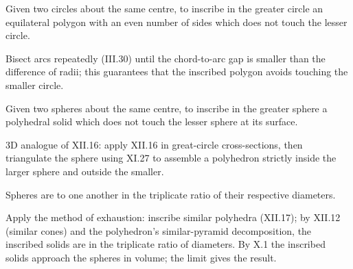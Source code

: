 \documentclass{rrxiv}
\begin{document}
\begin{claim}
\label{prop:XII.16}
Given two circles about the same centre, to inscribe in the greater
circle an equilateral polygon with an even number of sides which
does not touch the lesser circle.
\end{claim}
\begin{evidence}
\label{ev:XII.16}
Bisect arcs repeatedly (III.30) until the chord-to-arc gap is
smaller than the difference of radii; this guarantees that the
inscribed polygon avoids touching the smaller circle.
\end{evidence}

\begin{claim}
\label{prop:XII.17}
Given two spheres about the same centre, to inscribe in the greater
sphere a polyhedral solid which does not touch the lesser sphere at
its surface.
\end{claim}
\begin{evidence}
\label{ev:XII.17}
3D analogue of XII.16: apply XII.16 in great-circle cross-sections,
then triangulate the sphere using XI.27 to assemble a polyhedron
strictly inside the larger sphere and outside the smaller.
\end{evidence}

\begin{claim}
\label{prop:XII.18}
Spheres are to one another in the triplicate ratio of their
respective diameters.
\end{claim}
\begin{evidence}
\label{ev:XII.18}
Apply the method of exhaustion: inscribe similar polyhedra (XII.17);
by XII.12 (similar cones) and the polyhedron's similar-pyramid
decomposition, the inscribed solids are in the triplicate ratio of
diameters.  By X.1 the inscribed solids approach the spheres in
volume; the limit gives the result.
\end{evidence}
%
%
\end{document}
